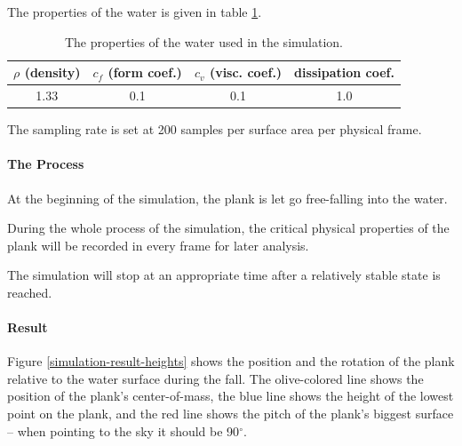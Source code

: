 The properties of the water is given in table \ref{simulation-water-properties}.

\begin{table}[h]
	\centering
	\begin{tabular}{ c c c c }
		\hline
		$\rho$ {\footnotesize(density)} & $c_f$ {\footnotesize(form coef.)} & $c_v$ {\footnotesize(visc. coef.)} & {\small dissipation coef.} \\
		\hline
		1.33 & 0.1 & 0.1 & 1.0 \\
		\hline
	\end{tabular}
	\caption{The properties of the water used in the simulation.}
	\label{simulation-water-properties}
\end{table}

The sampling rate is set at 200 samples per surface area per physical frame.

\paragraph*{The Process}

At the beginning of the simulation, the plank is let go free-falling into the water.

During the whole process of the simulation, the critical physical properties of the plank will be recorded in every frame for later analysis.

The simulation will stop at an appropriate time after a relatively stable state is reached.

\paragraph*{Result}

Figure \ref{simulation-result-heights} shows the position and the rotation of the plank relative to the water surface during the fall.
The olive-colored line shows the position of the plank's center-of-mass, the blue line shows the height of the lowest point on the plank, and the red line shows the pitch of the plank's biggest surface -- when pointing to the sky it should be 90$^\circ$.

